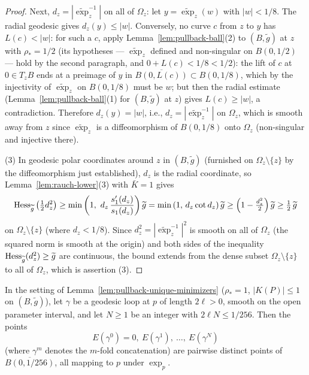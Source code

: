 \begin{proof}
Next, $d_z=|\widetilde\exp_z^{-1}|$ on all of $\Omega_z$: let
$y=\widetilde\exp_z(w)$ with $|w|<1/8$. The radial geodesic gives
$d_z(y)\le|w|$. Conversely, no curve $c$ from $z$ to $y$ has
$L(c)<|w|$: for such a $c$, apply
Lemma~\ref{lem:pullback-ball}(2) to $(B,\tilde g)$ at $z$ with
$\rho_*=1/2$ (its hypotheses --- $\widetilde\exp_z$ defined and
non-singular on $B(0,1/2)$ --- hold by the second paragraph, and
$0+L(c)<1/8<1/2$): the lift of $c$ at $0\in T_zB$ ends at a
preimage of $y$ in $\overline{B(0,L(c))}\subset B(0,1/8)$, which
by the injectivity of $\widetilde\exp_z$ on $B(0,1/8)$ must be
$w$; but then the radial estimate
(Lemma~\ref{lem:pullback-ball}(1) for $(B,\tilde g)$ at $z$)
gives $L(c)\ge|w|$, a contradiction. Therefore $d_z(y)=|w|$,
i.e., $d_z=|\widetilde\exp_z^{-1}|$ on $\Omega_z$, which is
smooth away from $z$ since $\widetilde\exp_z$ is a diffeomorphism
of $B(0,1/8)$ onto $\Omega_z$ (non-singular and injective there).

(3) In geodesic polar coordinates around $z$ in $(B,\tilde g)$
(furnished on $\Omega_z\setminus\{z\}$ by the diffeomorphism just
established), $d_z$ is the radial coordinate, so
Lemma~\ref{lem:rauch-lower}(3) with $\bar K=1$ gives
$$\operatorname{Hess}_{\widetilde g}\left(\tfrac12d_z^2\right)
\ge\min\left(1,\ d_z\,\frac{s_1'(d_z)}{s_1(d_z)}\right)\widetilde g
=\min\left(1,\,d_z\cot d_z\right)\widetilde g
\ge\left(1-\tfrac{d_z^2}{2}\right)\widetilde g\ge\tfrac12\,\widetilde g$$
on $\Omega_z\setminus\{z\}$ (where $d_z<1/8$). Since
$d_z^2=|\widetilde\exp_z^{-1}|^2$ is smooth on all of $\Omega_z$
(the squared norm is smooth at the origin) and both sides of the
inequality $\operatorname{Hess}_{\widetilde g}(d_z^2)\ge\widetilde g$ are continuous,
the bound extends from the dense subset
$\Omega_z\setminus\{z\}$ to all of $\Omega_z$, which is assertion
(3).
\end{proof}

\begin{lemma}
\label{lem:loop-multiples-distinct}


In the setting of Lemma~\ref{lem:pullback-unique-minimizers}
($\rho_*=1$, $|K(P)|\le1$ on $(B,\tilde g)$), let $\gamma$ be a
geodesic loop at $p$ of length $2\ell>0$, smooth on the open
parameter interval, and let $N\ge1$ be an integer with
$2\ell N\le1/256$. Then the points
$$E(\gamma^0)=0,\ E(\gamma^1),\ \ldots,\ E(\gamma^N)$$
(where $\gamma^m$ denotes the $m$-fold concatenation) are pairwise
distinct points of $\overline{B(0,1/256)}$, all mapping to $p$
under $\exp_p$.
\end{lemma}

